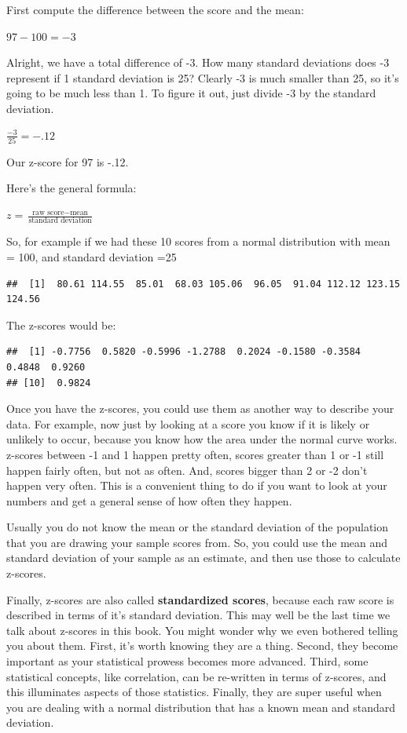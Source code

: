 \documentclass[]{book}
\begin{document}
First compute the difference between the score and the mean:

\(97-100 = -3\)

Alright, we have a total difference of -3. How many standard deviations does -3 represent if 1 standard deviation is 25? Clearly -3 is much smaller than 25, so it's going to be much less than 1. To figure it out, just divide -3 by the standard deviation.

\(\frac{-3}{25} = -.12\)

Our z-score for 97 is -.12.

Here's the general formula:

\(z = \frac{\text{raw score} - \text{mean}}{\text{standard deviation}}\)

So, for example if we had these 10 scores from a normal distribution with mean = 100, and standard deviation =25

\begin{verbatim}
##  [1]  80.61 114.55  85.01  68.03 105.06  96.05  91.04 112.12 123.15 124.56
\end{verbatim}

The z-scores would be:

\begin{verbatim}
##  [1] -0.7756  0.5820 -0.5996 -1.2788  0.2024 -0.1580 -0.3584  0.4848  0.9260
## [10]  0.9824
\end{verbatim}

Once you have the z-scores, you could use them as another way to describe your data. For example, now just by looking at a score you know if it is likely or unlikely to occur, because you know how the area under the normal curve works. z-scores between -1 and 1 happen pretty often, scores greater than 1 or -1 still happen fairly often, but not as often. And, scores bigger than 2 or -2 don't happen very often. This is a convenient thing to do if you want to look at your numbers and get a general sense of how often they happen.

Usually you do not know the mean or the standard deviation of the population that you are drawing your sample scores from. So, you could use the mean and standard deviation of your sample as an estimate, and then use those to calculate z-scores.

Finally, z-scores are also called \textbf{standardized scores}, because each raw score is described in terms of it's standard deviation. This may well be the last time we talk about z-scores in this book. You might wonder why we even bothered telling you about them. First, it's worth knowing they are a thing. Second, they become important as your statistical prowess becomes more advanced. Third, some statistical concepts, like correlation, can be re-written in terms of z-scores, and this illuminates aspects of those statistics. Finally, they are super useful when you are dealing with a normal distribution that has a known mean and standard deviation.
\end{document}
